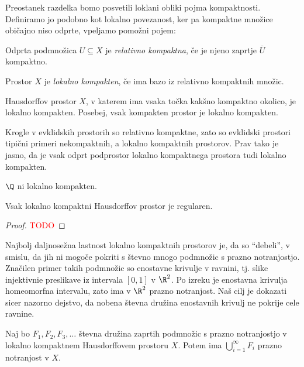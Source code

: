 Preostanek razdelka bomo posvetili loklani obliki pojma kompaktnosti. Definiramo jo podobno kot lokalno povezanost, ker pa kompaktne množice običajno niso odprte, vpeljamo pomožni pojem:
\begin{definicija}
    Odprta podmnožica $U \subseteq X$ je \emph{relativno kompaktna}, če je njeno zaprtje \(\overline{U}\) kompaktno.
\end{definicija}

\begin{definicija}
    Prostor $X$ je \emph{lokalno kompakten}, če ima bazo iz relativno kompaktnih množic.
\end{definicija}

\begin{izrek}
    Hausdorffov prostor $X$, v katerem ima vsaka točka kakšno kompaktno okolico, je lokalno kompakten. Posebej, vsak kompakten prostor je lokalno kompakten.
\end{izrek}

Krogle v evklidskih prostorih so relativno kompaktne, zato so evklidski prostori  tipični primeri nekompaktnih, a lokalno kompaktnih prostorov. Prav tako je jasno, da je vsak odprt podprostor lokalno kompaktnega prostora tudi lokalno kompakten.

\begin{primer}
    \(\Q\) ni lokalno kompakten.
\end{primer}

\begin{izrek}
    Vsak lokalno kompaktni Hausdorffov prostor je regularen.
\end{izrek}

\begin{proof}
    \textcolor{red}{TODO}
\end{proof}

Najbolj daljnosežna lastnost lokalno kompaktnih prostorov je, da so "`debeli"', v smislu, da jih ni mogoče pokriti s števno mnogo podmnožic s prazno notranjostjo. Značilen primer takih podmnožic so enostavne krivulje v ravnini, tj. slike injektivnie preslikave iz intervala $[0,1]$ v $\R^2$. Po izreku je enostavna krivulja homeomorfna intervalu, zato ima v \(\R^2\) prazno notranjost. Naš cilj je dokazati sicer nazorno dejstvo, da nobena števna družina enostavnih krivulj ne pokrije cele ravnine.

\begin{izrek}
    Naj bo $F_1, F_2, F_3, \ldots$ števna družina zaprtih podmnožic s prazno notranjostjo v lokalno kompaktnem Hausdorffovem prostoru \(X\). Potem ima $\bigcup_{i=1}^\infty F_i$ prazno notranjost v $X$. 
\end{izrek}

